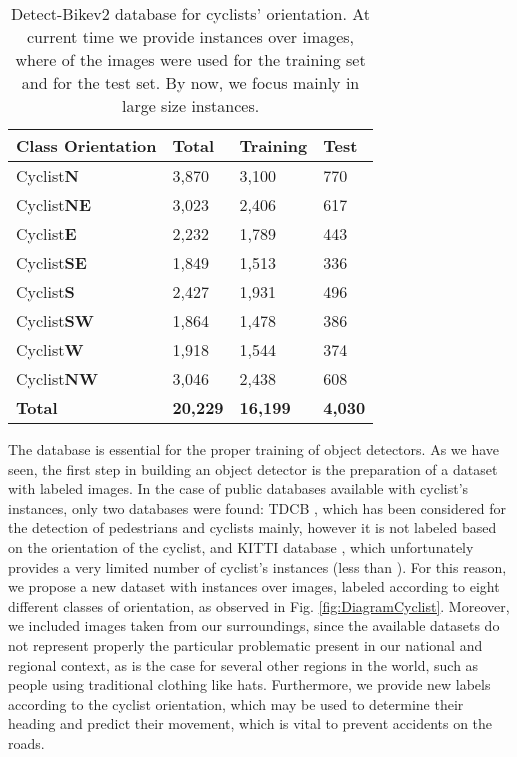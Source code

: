 \documentclass[journal]{IEEEtran}
\begin{document}
\begin{table}[hb!]
\begin{minipage}[c]{0.45\textwidth}
\caption{Detect-Bikev2 database for cyclists' orientation. At current time we provide  instances over  images, where  of the images were used for the training set and  for the test set. By now, we focus mainly in large size instances.
\label{table:CyclistDBOrientation}}
\end{minipage}
\addtolength{\tabcolsep}{-1pt}
\begin{center}
\begin{tabular}{llll}
\toprule
{Class Orientation}& {Total} & {Training} & {Test}  \\
\midrule
{Cyclist\textbf{N}} & 3,870 & 3,100 &   770 \\\hline
{Cyclist\textbf{NE}} & 3,023 & 2,406 &  617 \\\hline
{Cyclist\textbf{E}} & 2,232  &  1,789 &  443  \\\hline
{Cyclist\textbf{SE}} & 1,849  &   1,513 &  336  \\\hline
{Cyclist\textbf{S}} & 2,427  &  1,931 & 496    \\ \hline
{Cyclist\textbf{SW}} &  1,864 &  1,478 &   386  \\\hline
{Cyclist\textbf{W}} & 1,918  & 1,544 &   374 \\\hline
{Cyclist\textbf{NW} }& 3,046 & 2,438 &  608  \\\hline
{\textbf{Total}} &\textbf{20,229}  & \textbf{16,199} & \textbf{4,030} \\\hline
\bottomrule
\end{tabular}
\end{center}
\end{table}


The database is essential for the proper training of object detectors. As we have seen, the first step in building an object detector is the preparation of a dataset with labeled images. In the case of public databases available with cyclist's instances, only two databases were found: TDCB \cite{BenchmarkCylistDetect2016}, which has been considered for the detection of pedestrians and cyclists mainly, however it is not labeled based on the orientation of the cyclist, and KITTI database \cite{geiger2012we}, which unfortunately provides a very limited number of cyclist's instances (less than ). For this reason, we propose a new dataset with  instances over  images, labeled according to eight different classes of  orientation, as observed in Fig. \ref{fig:DiagramCyclist}. Moreover, we included images taken from our surroundings, since the available datasets do not represent properly the particular problematic present in our national and regional context, as is the case for several other regions in the world, such as people using traditional clothing like hats. Furthermore, we provide new labels according to the cyclist orientation, which may be used to determine their heading and predict their movement, which is vital to prevent accidents on the roads. 
\end{document}
